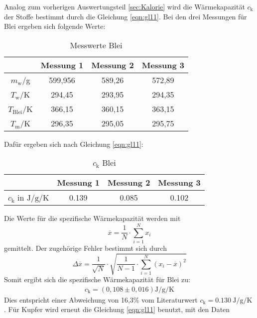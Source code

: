Analog zum vorherigen Auswertungsteil \ref{sec:Kalorie} wird die Wärmekapazität $c_\text{k}$ der Stoffe bestimmt durch die Gleichung \eqref{eqn:gl11}.
Bei den drei Messungen für Blei ergeben sich folgende Werte:
\begin{table}
  \centering
  \caption{Messwerte Blei}
  \label{tab:WerteBlei}
  \begin{tabular}{c c c c}
   \toprule
   & Messung 1 & Messung 2 & Messung 3 \\
   \midrule
   $m_\text{w}$/g & 599,956 & 589,26 & 572,89 \\
   $T_\text{w}$/K & 294,45 & 293,95 & 294,35 \\
   $T_\text{Blei}$/K & 366,15 & 360,15 & 363,15 \\
   $T_\text{m}$/K & 296,35 & 295,05 & 295,75 \\
   \bottomrule
  \end{tabular}
\end{table}
\FloatBarrier
\noindent
Dafür ergeben sich nach Gleichung \eqref{eqn:gl11}:
\begin{table}
  \centering
  \caption{$c_\text{k}$ Blei}
  \label{tab:ckBlei}
  \begin{tabular}{c c c c}
   \toprule
   & Messung 1 & Messung 2 & Messung 3 \\
   \midrule
   $c_\text{k}$ in $\si{\joule\per\gram\per\kelvin}$ & 0.139 & 0.085 & 0.102 \\
   \bottomrule
  \end{tabular}
\end{table}
\FloatBarrier
\noindent
Die Werte für die spezifische Wärmekapazität werden mit
\begin{equation}
  \overline{x} = \frac{1}{N} \cdot \sum_{i=1}^N x_i
\end{equation}
gemittelt. Der zugehörige Fehler bestimmt sich durch
\begin{equation}
  \Delta \overline{x} = \frac{1}{\sqrt{N}} \cdot \sqrt{\frac{1}{N-1} \cdot \sum_{i=1}^N \left(x_i - \overline{x}\right)^2}
  \label{eqn:fehlermittel}
\end{equation}
Somit ergibt sich die spezifische Wärmekapazität für Blei zu:
\begin{align*}
  c_\text{k} = \left(0,108 \pm 0,016 \right) \si{\joule\per\gram\per\kelvin}
\end{align*}
Dies entspricht einer Abweichung von 16,3\% vom Literaturwert $c_\text{k} = \SI{0,130}{\joule\per\gram\per\kelvin}$ \cite{Wkappa}.
\noindent
Für Kupfer wird erneut die Gleichung \eqref{eqn:gl11} benutzt, mit den Daten
